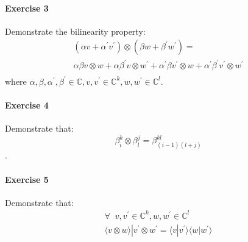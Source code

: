 \documentclass[a4paper,10pt]{article}
\begin{document}
\paragraph{Exercise 3}
\label{ex03q}
Demonstrate the bilinearity property:
\begin{equation*}
\begin{split}
(\alpha v + {\alpha}^{'} v^{'}) \otimes (\beta w + {\beta}^{'} w^{'}) = \\
\alpha \beta v \otimes w + \alpha {\beta}^{'} v \otimes w^{'} + {\alpha}^{'} \beta v^{'} \otimes w + {\alpha}^{'} {\beta}^{'} v^{'} \otimes w^{'} \\
\end{split}
\end{equation*}
where $\alpha, \beta, {\alpha}^{'}, {\beta}^{'} \in \mathbb{C}, v, v^{'} \in \mathbb{C}^k, w, w^{'} \in \mathbb{C}^l$.
\paragraph{Exercise 4}
\label{ex04q}
Demonstrate that:
$$\beta_{i}^{k} \otimes \beta_{l}^{j} = \beta_{(i-1)(l+j)}^{kl}$$.
\paragraph{Exercise 5}
\label{ex05q}
Demonstrate that: 
\begin{equation*}
\begin{split}
\forall \; \; v, v^{'} \in \mathbb{C}^{k}, w, w^{'} \in \mathbb{C}^{l} \\
\langle v \otimes w\rangle | v^{'} \otimes w^{'} = \langle v | v^{'}\rangle \langle w | w^{'}\rangle
\end{split}
\end{equation*}
\end{document}
